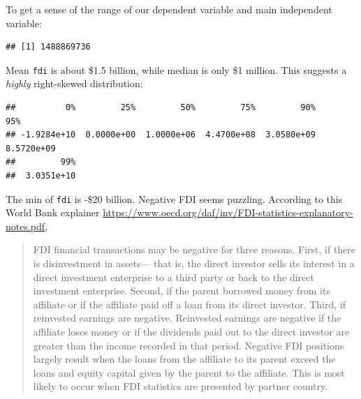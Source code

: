 \documentclass[11pt,]{article}
\newenvironment{Shaded}{\begin{snugshade}}{\end{snugshade}}
\newcommand{\DecValTok}[1]{\textcolor[rgb]{0.00,0.00,0.81}{#1}}
\newcommand{\FloatTok}[1]{\textcolor[rgb]{0.00,0.00,0.81}{#1}}
\newcommand{\KeywordTok}[1]{\textcolor[rgb]{0.13,0.29,0.53}{\textbf{#1}}}
\newcommand{\NormalTok}[1]{#1}
\newcommand{\OperatorTok}[1]{\textcolor[rgb]{0.81,0.36,0.00}{\textbf{#1}}}
\begin{document}
To get a sense of the range of our dependent variable and main
independent variable:

\begin{Shaded}
\end{Shaded}

\begin{verbatim}
## [1] 1488869736
\end{verbatim}

Mean \texttt{fdi} is about \$1.5 billion, while median is only \$1
million. This suggests a \emph{highly} right-skewed distribution:

\begin{Shaded}
\end{Shaded}

\begin{verbatim}
##          0%         25%         50%         75%         90%         95% 
## -1.9284e+10  0.0000e+00  1.0000e+06  4.4700e+08  3.0580e+09  8.5720e+09 
##         99% 
##  3.0351e+10
\end{verbatim}

The min of \texttt{fdi} is -\$20 billion. Negative FDI seems puzzling.
According to this World Bank explainer
\url{https://www.oecd.org/daf/inv/FDI-statistics-explanatory-notes.pdf},

\begin{quote}
FDI financial transactions may be negative for three reasons. First, if
there is disinvestment in assets--- that is, the direct investor sells
its interest in a direct investment enterprise to a third party or back
to the direct investment enterprise. Second, if the parent borrowed
money from its affiliate or if the affiliate paid off a loan from its
direct investor. Third, if reinvested earnings are negative. Reinvested
earnings are negative if the affiliate loses money or if the dividends
paid out to the direct investor are greater than the income recorded in
that period. Negative FDI positions largely result when the loans from
the affiliate to its parent exceed the loans and equity capital given by
the parent to the affiliate. This is most likely to occur when FDI
statistics are presented by partner country.
\end{quote}
\end{document}
